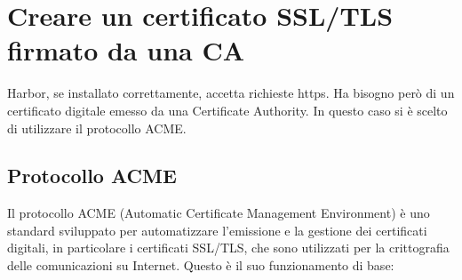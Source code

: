\documentclass[12pt,a4paper]{report}
\begin{document}
\section{Creare un certificato SSL/TLS firmato da una CA}
Harbor, se installato correttamente, accetta richieste https. Ha bisogno però di un certificato digitale emesso da una Certificate Authority. In questo caso si è scelto di utilizzare il protocollo ACME. 
\subsection{Protocollo ACME}
Il protocollo ACME (Automatic Certificate Management Environment) è uno standard sviluppato per automatizzare l'emissione e la gestione dei certificati digitali, in particolare i certificati SSL/TLS, che sono utilizzati per la crittografia delle comunicazioni su Internet.
Questo è il suo funzionamento di base:
\end{document}
